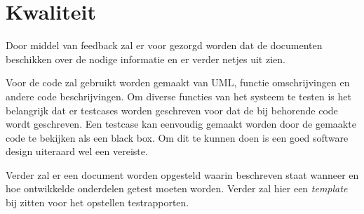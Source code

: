 \chapter{Kwaliteit}

Door middel van feedback zal er voor gezorgd worden dat de documenten beschikken
over de nodige informatie en er verder netjes uit zien.

Voor de code zal gebruikt worden gemaakt van UML, functie omschrijvingen en
andere code beschrijvingen. Om diverse functies van het systeem te testen is
het belangrijk dat er testcases worden geschreven voor dat de bij behorende
code wordt geschreven. Een testcase kan eenvoudig gemaakt worden door de
gemaakte code te bekijken als een black box. Om dit te kunnen doen is een goed
software design uiteraard wel een vereiste.

Verder zal er een document worden opgesteld waarin beschreven staat wanneer en
hoe ontwikkelde onderdelen getest moeten worden. Verder zal hier een
\emph{template} bij zitten voor het opstellen testrapporten.
